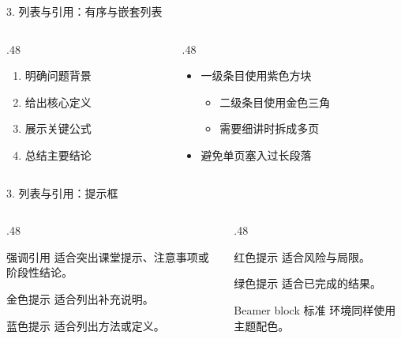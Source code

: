 \documentclass[aspectratio=169,10pt]{beamer}
\begin{document}
\begin{frame}{3. 列表与引用：有序与嵌套列表}
\begin{columns}[T,onlytextwidth]
  \begin{column}{.48\textwidth}
    \begin{enumerate}
      \item 明确问题背景
      \item 给出核心定义
      \item 展示关键公式
      \item 总结主要结论
    \end{enumerate}
  \end{column}
  \begin{column}{.48\textwidth}
    \begin{itemize}
      \item 一级条目使用紫色方块
      \begin{itemize}
        \item 二级条目使用金色三角
        \item 需要细讲时拆成多页
      \end{itemize}
      \item 避免单页塞入过长段落
    \end{itemize}
  \end{column}
\end{columns}
\end{frame}

\begin{frame}[t]{3. 列表与引用：提示框}
\begin{columns}[T,onlytextwidth]
  \begin{column}{.48\textwidth}
    \begin{njuquote}{强调引用}
      适合突出课堂提示、注意事项或阶段性结论。
    \end{njuquote}
    \begin{njuquotegold}{金色提示}
      适合列出补充说明。
    \end{njuquotegold}
    \begin{njuquoteblue}{蓝色提示}
      适合列出方法或定义。
    \end{njuquoteblue}
  \end{column}
  \begin{column}{.48\textwidth}
    \begin{njuquotered}{红色提示}
      适合风险与局限。
    \end{njuquotered}
    \begin{njuquotegreen}{绿色提示}
      适合已完成的结果。
    \end{njuquotegreen}
    \begin{block}{Beamer block}
      标准  环境同样使用主题配色。
    \end{block}
  \end{column}
\end{columns}
\end{frame}
\end{document}
